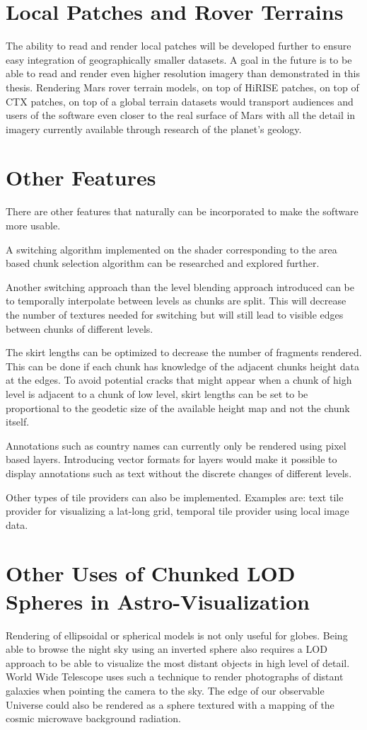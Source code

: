 \section{Local Patches and Rover Terrains}
The ability to read and render local patches will be developed further to ensure easy integration of geographically smaller datasets. A goal in the future is to be able to read and render even higher resolution imagery than demonstrated in this thesis. Rendering Mars rover terrain models, on top of HiRISE patches, on top of CTX patches, on top of a global terrain datasets would transport audiences and users of the software even closer to the real surface of Mars with all the detail in imagery currently available through research of the planet's geology.

\section{Other Features}
There are other features that naturally can be incorporated to make the software more usable. 

A switching algorithm implemented on the shader corresponding to the area based chunk selection algorithm can be researched and explored further.

Another switching approach than the level blending approach introduced can be to temporally interpolate between levels as chunks are split. This will decrease the number of textures needed for switching but will still lead to visible edges between chunks of different levels.

The skirt lengths can be optimized to decrease the number of fragments rendered. This can be done if each chunk has knowledge of the adjacent chunks height data at the edges. To avoid potential cracks that might appear when a chunk of high level is adjacent to a chunk of low level, skirt lengths can be set to be proportional to the geodetic size of the available height map and not the chunk itself.

Annotations such as country names can currently only be rendered using pixel based layers. Introducing vector formats for layers would make it possible to display annotations such as text without the discrete changes of different levels.

Other types of tile providers can also be implemented. Examples are: text tile provider for visualizing a lat-long grid, temporal tile provider using local image data.

\section{Other Uses of Chunked LOD Spheres in Astro-Visualization}
Rendering of ellipsoidal or spherical models is not only useful for globes. Being able to browse the night sky using an inverted sphere also requires a LOD approach to be able to visualize the most distant objects in high level of detail. World Wide Telescope uses such a  technique to render photographs of distant galaxies when pointing the camera to the sky. The edge of our observable Universe could also be rendered as a sphere textured with a mapping of the cosmic microwave background radiation.